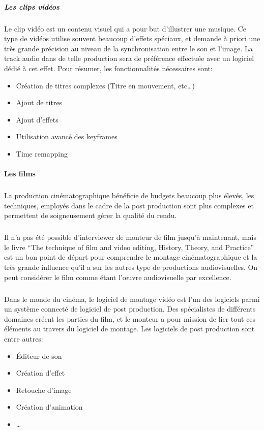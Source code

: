 \subparagraph {Les clips vidéos}
\subparagraph{}
Le clip vidéo est un contenu visuel qui a pour but d'illustrer
une musique. Ce type de vidéos utilise souvent beaucoup d'effets spéciaux, et demande à
priori une très grande précision au niveau de la synchronisation
entre le son et l'image. La track audio dans de telle production
sera de préférence effectuée avec un logiciel dédié à cet
effet. Pour résumer, les fonctionnalités nécessaires sont:
\begin{itemize}
  \item{Création de titres complexes (Titre en mouvement, etc\ldots)}
  \item{Ajout de titres}
  \item{Ajout d'effets}
  \item{Utilisation avancé des keyframes}
  \item{Time remapping}
\end{itemize}

\paragraph {Les films}
\subparagraph{}
La production cinématographique bénéficie de budgets beaucoup plus élevés, les techniques,
employés dans le cadre de la post production sont plus complexes et permettent de soigneusement
gérer la qualité du rendu.

\subparagraph{}
Il n'a pas été possible d'interviewer de monteur de film jusqu'à maintenant, mais
le livre ``The technique of film and video editing, History, Theory, and Practice''
\cite{TheTechniqueOfFilmAndVideoEditing} est un bon point de départ pour
comprendre le montage cinématographique et la très grande influence qu'il a
sur les autres type de productions audiovisuelles. On peut considérer le film comme
étant l'œuvre audiovisuelle par excellence. %

\subparagraph{}
Dans le monde du cinéma, le logiciel de montage vidéo est l'un des logiciels
parmi un système connecté de logiciel de post production. Des spécialistes de
différents domaines créent les parties du film, et le monteur a pour mission
de lier tout ces éléments au travers du logiciel de montage. Les logiciels
de post production sont entre autres:
\begin{itemize}
  \item{Éditeur de son}
  \item{Création d'effet}
  \item{Retouche d'image}
  \item{Création d'animation}
  \item{\ldots}
\end{itemize}

